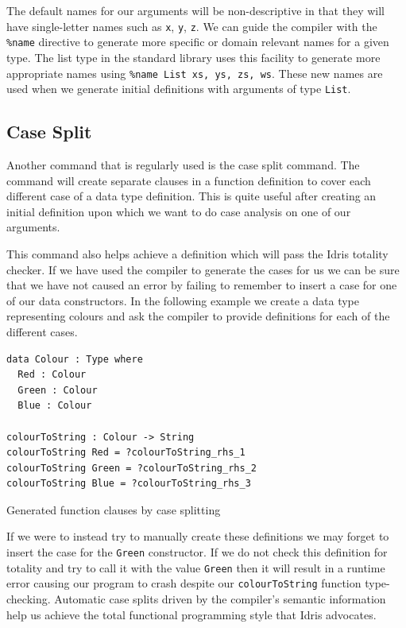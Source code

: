 \documentclass[a4paper, notitlepage]{report}
\begin{document}
The default names for our arguments will be non-descriptive in that they will
have single-letter names such as \texttt{x}, \texttt{y}, \texttt{z}. We can guide the compiler with the
\texttt{\%name} directive to generate more specific or domain relevant names for a given
type. The list type in the standard library uses this facility to generate more
appropriate names using \texttt{\%name List xs, ys, zs, ws}. These new names are used when
we generate initial definitions with arguments of type \texttt{List}.

\subsection{Case Split}
\label{sec:org6bc74ad}
Another command that is regularly used is the case split command. The command
will create separate clauses in a function definition to cover each different
case of a data type definition. This is quite useful after creating an initial
definition upon which we want to do case analysis on one of our arguments.

This command also helps achieve a definition which will pass the Idris totality
checker. If we have used the compiler to generate the cases for us we can be
sure that we have not caused an error by failing to remember to insert a case
for one of our data constructors. In the following example we create a data type
representing colours and ask the compiler to provide definitions for each of the
different cases.

\begin{listing}[H]
\begin{verbatim}
data Colour : Type where
  Red : Colour
  Green : Colour
  Blue : Colour

colourToString : Colour -> String
colourToString Red = ?colourToString_rhs_1
colourToString Green = ?colourToString_rhs_2
colourToString Blue = ?colourToString_rhs_3
\end{verbatim}
\caption{Generated function clauses by case splitting}
\end{listing}

If we were to instead try to manually create these definitions we may forget to
insert the case for the \texttt{Green} constructor. If we do not check this definition
for totality and try to call it with the value \texttt{Green} then it will result in a
runtime error causing our program to crash despite our \texttt{colourToString} function
type-checking. Automatic case splits driven by the compiler's semantic
information help us achieve the total functional programming style that Idris
advocates.
\end{document}
